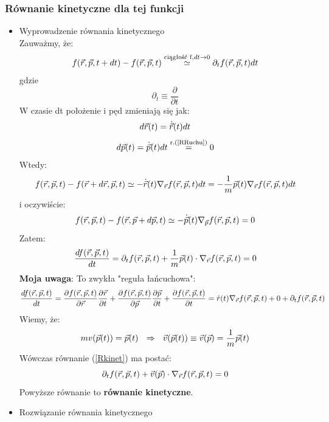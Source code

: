 \subsubsection{Równanie kinetyczne dla tej funkcji}
\begin{itemize}
\item{Wyprowadzenie równania kinetycznego}\\
Zauważmy, że:
\begin{equation}f(\vec{r},\vec{p},t+dt)-f(\vec{r},\vec{p},t) \stackrel{\text{ciągłość f}, dt\rightarrow 0}{\simeq}\partial_tf(\vec{r},\vec{p},t) dt\end{equation}
gdzie
\begin{equation}\partial_t\equiv \frac{\partial}{\partial t}\end{equation}
W czasie dt położenie i pęd zmieniają się jak:
\begin{equation}d\vec{r}(t)=\dot{\vec{r}}(t)dt \end{equation}
\begin{equation} d\vec{p}(t)=\dot{\vec{p}}(t)dt \stackrel{\text{r.(\ref{RRuchu})}}{=}0\end{equation}
Wtedy:
\begin{equation}f(\vec{r},\vec{p},t)-f(\vec{r}+d\vec{r},\vec{p},t)\simeq -\dot{\vec{r}}(t)\nabla_{\vec{r}}f(\vec{r},\vec{p},t) dt=-\frac{1}{m}\vec{p}(t)\nabla_{\vec{r}}f(\vec{r},\vec{p},t) dt\end{equation}
i oczywiście:
\begin{equation}f(\vec{r},\vec{p},t)-f(\vec{r},\vec{p}+d\vec{p},t)\simeq -\dot{\vec{p}}(t)\nabla_{\vec{p}}f(\vec{r},\vec{p},t)=0 \end{equation}
Zatem:
\begin{equation}\frac{df(\vec{r},\vec{p},t)}{dt}=\partial_tf(\vec{r},\vec{p},t)+\frac{1}{m}\vec{p}(t)\cdot\nabla_{\vec{r}}f(\vec{r},\vec{p},t)=0 \label{Rkinet}\end{equation} 
\textbf{Moja uwaga}: To zwykła "reguła łańcuchowa":
\begin{equation} \frac{df(\vec{r},\vec{p},t)}{dt}=\frac{\partial f(\vec{r},\vec{p},t)}{\partial\vec{r}}\frac{\partial\vec{r}}{\partial t}+\frac{\partial f(\vec{r},\vec{p},t)}{\partial\vec{p}}\frac{\partial\vec{p}}{\partial t}+\frac{\partial f(\vec{r},\vec{p},t)}{\partial t}=\dot{r}(t)\nabla_{\vec{r}}f(\vec{r},\vec{p},t)+0+\partial_tf(\vec{r},\vec{p},t)\end{equation}
Wiemy, że:
\begin{equation}mv(\vec{p}(t))=\vec{p}(t)~~ \Rightarrow ~~\vec{v}(\vec{p}(t))\equiv\vec{v}(\vec{p})=\frac{1}{m}\vec{p}(t)\end{equation}
Wówczas równanie (\ref{Rkinet}) ma postać:
\begin{equation}\partial_tf(\vec{r},\vec{p},t)+\vec{v}(\vec{p})\cdot\nabla_{\vec{r}}f(\vec{r},\vec{p},t)=0\label{Rkinet2}\end{equation}
Powyższe równanie to \textbf{równanie kinetyczne}.
\item{Rozwiązanie równania kinetycznego}\\

\end{itemize}
